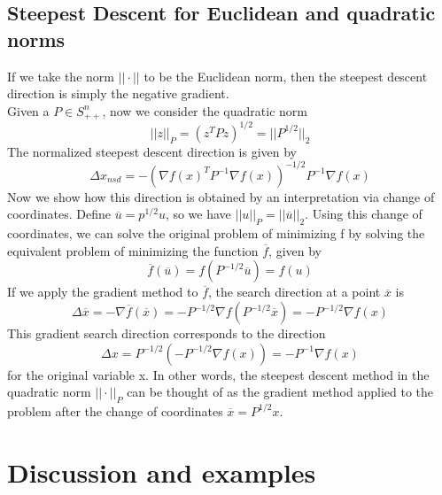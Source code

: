 \documentclass{acm_proc_article-sp}
\begin{document}
\subsection{Steepest Descent for Euclidean and quadratic norms}
If  we take the norm $||\cdot||$ to be the Euclidean norm, then the steepest descent direction is simply the negative gradient.\\
Given a $P \in S^n_{++}$, now we consider the quadratic norm
\begin{displaymath}
||z||_P = (z^TPz)^{1/2} = ||P^{1/2}||_2
\end{displaymath}
The normalized steepest descent direction is given by
\begin{displaymath}
\Delta x_{nsd} = -(\nabla f(x) ^ T P ^{-1} \nabla f(x))^{-1/2} P ^{-1} \nabla f(x)
\end{displaymath}
Now we show how this direction is obtained by an interpretation via change of coordinates. Define $\overline{u} = p^{1/2} u$, so we have $||u||_P = ||\overline{u}||_2$. Using this change of coordinates, we can solve the original problem of minimizing f by solving the equivalent problem of minimizing the function $\overline{f}$, given by
\begin{displaymath}
\overline{f}(\overline{u})=f(P^{-1/2}\overline{u})=f(u)
\end{displaymath}
If we apply the gradient method to $\overline{f}$, the search direction at a point $\overline{x}$ is
\begin{displaymath}
\Delta\overline{x} = - \nabla \overline{f}(\overline{x}) = -P^{-1/2} \nabla f(P^{-1/2}\overline{x}) = -P^{-1/2} \nabla f(x)
\end{displaymath}
This gradient search direction corresponds to the direction
\begin{displaymath}
\Delta x = P^{-1/2}(-P^{-1/2}\nabla f(x)) = - P^{-1} \nabla f(x)
\end{displaymath}
for the original variable x. In other words, the steepest descent method in the quadratic norm $||\cdot||_P$ can be thought of as the gradient method applied to the problem after the change of coordinates $\overline{x} = P^{1/2} x$.
\section{Discussion and examples}
\end{document}
